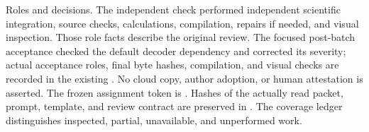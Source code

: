\documentclass[10pt]{article}
\begin{document}
Roles and decisions. The independent check performed independent scientific integration, source checks, calculations, compilation, repairs if needed, and visual inspection. Those role facts describe the original review. The focused post-batch acceptance checked the default decoder dependency and corrected its severity; actual acceptance roles, final byte hashes, compilation, and visual checks are recorded in the existing . No cloud copy, author adoption, or human attestation is asserted. The frozen assignment token is . Hashes of the actually read packet, prompt, template, and review contract are preserved in . The coverage ledger distinguishes inspected, partial, unavailable, and unperformed work.\par
\end{document}
